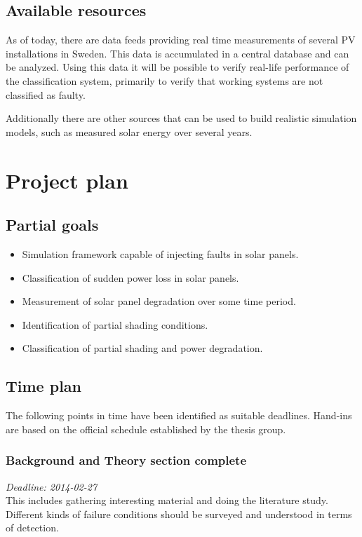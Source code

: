 \documentclass[a4paper,11pt]{article}
\begin{document}
\subsection*{Available resources}
As of today, there are data feeds providing real time measurements of several PV installations in Sweden.
This data is accumulated in a central database and can be analyzed.
Using this data it will be possible to verify real-life performance of the classification system, primarily to verify that working systems are not classified as faulty.

Additionally there are other sources that can be used to build realistic simulation models, such as measured solar energy over several years.

\section*{Project plan}
\subsection*{Partial goals}
\begin{itemize}
\item Simulation framework capable of injecting faults in solar panels.
\item Classification of sudden power loss in solar panels.
\item Measurement of solar panel degradation over some time period.
\item Identification of partial shading conditions.
\item Classification of partial shading and power degradation.
\end{itemize}

\clearpage
\subsection*{Time plan}
The following points in time have been identified as suitable deadlines.
Hand-ins are based on the official schedule established by the thesis group.

\subsubsection*{Background and Theory section complete}
\noindent
\emph{Deadline: 2014-02-27}\\
\noindent
This includes gathering interesting material and doing the literature study.
Different kinds of failure conditions should be surveyed and understood in terms of detection.
\end{document}
